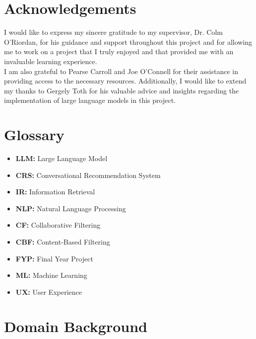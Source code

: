 





\section{Acknowledgements}
\label{sec:acknowledgements}
I would like to express my sincere gratitude to my supervisor, Dr. Colm O'Riordan, for his guidance and support throughout this project and for allowing me to work on a project that I truly enjoyed and that provided me with an invaluable learning experience.
\\
I am also grateful to Pearse Carroll and Joe O'Connell for their assistance in providing access to the necessary resources. Additionally, I would like to extend my thanks to Gergely Toth for his valuable advice and insights regarding the implementation of large language models in this project.

\section{Glossary}
\label{sec:glossary}
\begin{itemize}
    \item \textbf{LLM:} Large Language Model
    \item \textbf{CRS:} Conversational Recommendation System
    \item \textbf{IR:} Information Retrieval
    \item \textbf{NLP:} Natural Language Processing
    \item \textbf{CF:} Collaborative Filtering
    \item \textbf{CBF:} Content-Based Filtering
    \item \textbf{FYP:} Final Year Project
    \item \textbf{ML:} Machine Learning
    \item \textbf{UX:} User Experience
\end{itemize}


\section{Domain Background}
\label{sec:domain_background}

